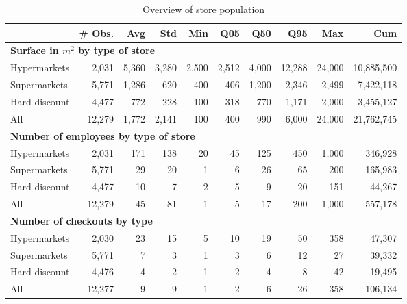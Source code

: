 \documentclass[11pt]{article}
\begin{document}
\begin{table}[H]
\renewcommand{\arraystretch}{0.7}%
\caption{Overview of store population}
\small

\begin{tabular}{lrrrrrrrrr}
\toprule
\toprule
{} &     \# Obs. &        Avg &        Std &        Min &        Q05 &        Q50 &        Q95 &        Max &        Cum \\
\midrule

\multicolumn{10}{l}{\textbf{Surface in $m^2$ by type of store}} \\
\midrule
Hypermarkets  &      2,031 &      5,360 &      3,280 &      2,500 &      2,512 &      4,000 &     12,288 &     24,000 & 10,885,500 \\
Supermarkets  &      5,771 &      1,286 &        620 &        400 &        406 &      1,200 &      2,346 &      2,499 &  7,422,118 \\
Hard discount &      4,477 &        772 &        228 &        100 &        318 &        770 &      1,171 &      2,000 &  3,455,127 \\
\midrule
All           &     12,279 &      1,772 &      2,141 &        100 &        400 &        990 &      6,000 &     24,000 & 21,762,745 \\
\midrule

\multicolumn{10}{l}{\textbf{Number of employees by type of store}} \\
\midrule
Hypermarkets  &      2,031 &        171 &        138 &         20 &         45 &        125 &        450 &      1,000 &    346,928 \\
Supermarkets  &      5,771 &         29 &         20 &          1 &          6 &         26 &         65 &        200 &    165,983 \\
Hard discount &      4,477 &         10 &          7 &          2 &          5 &          9 &         20 &        151 &     44,267 \\
\midrule
All           &     12,279 &         45 &         81 &          1 &          5 &         17 &        200 &      1,000 &    557,178 \\
\midrule

\multicolumn{10}{l}{\textbf{Number of checkouts by type}} \\
\midrule
Hypermarkets  &      2,030 &         23 &         15 &          5 &         10 &         19 &         50 &        358 &     47,307 \\
Supermarkets  &      5,771 &          7 &          3 &          1 &          3 &          6 &         12 &         27 &     39,332 \\
Hard discount &      4,476 &          4 &          2 &          1 &          2 &          4 &          8 &         42 &     19,495 \\
\midrule
All           &     12,277 &          9 &          9 &          1 &          2 &          6 &         26 &        358 &    106,134 \\
\midrule


\end{tabular}
\end{table}
\end{document}
